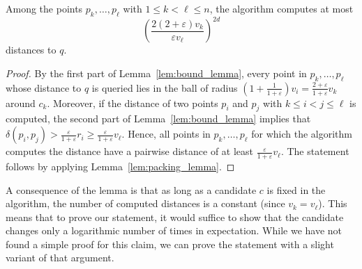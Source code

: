 \documentclass[a4paper,USenglish]{socg-lipics-v2018}
\newcommand{\eps}{\varepsilon}
\newcommand{\dist}{\delta}
\begin{document}
\begin{lemma}
Among the points $p_k,\ldots,p_\ell$ with $1\leq k< \ell\leq n$, the algorithm computes at most
\[\left(\frac{2(2+\eps) v_k}{\eps v_\ell}\right)^{2d}\]
distances to $q$.
\end{lemma}
\begin{proof}
By the first part of Lemma~\ref{lem:bound_lemma}, every point in $p_k,\ldots,p_\ell$
whose distance to $q$ is queried lies in the ball of radius $(1+\frac{1}{1+\eps})v_i=\frac{2+\eps}{1+\eps} v_k$
around $c_k$. Moreover, if the distance of two points $p_i$ and $p_j$ with $k\leq i<j\leq\ell$
is computed, the second part of Lemma~\ref{lem:bound_lemma} implies that $\dist(p_i,p_j)> \frac{\eps}{1+\eps}r_i\geq \frac{\eps}{1+\eps}v_\ell$.
Hence, all points in $p_k,\ldots,p_\ell$ for which the algorithm computes the distance
have a pairwise distance of at least $\frac{\eps}{1+\eps}v_\ell$. The statement follows by applying Lemma~\ref{lem:packing_lemma}.
\end{proof}

A consequence of the lemma is that as long as a candidate $c$ is fixed in the algorithm,
the number of computed distances is a constant (since $v_k=v_\ell$). This means that to prove our statement, it would suffice to show
that the candidate changes only a logarithmic number of times in expectation.
While we have not found a simple proof for this claim, we can prove the statement with a slight variant of
that argument.
\end{document}
